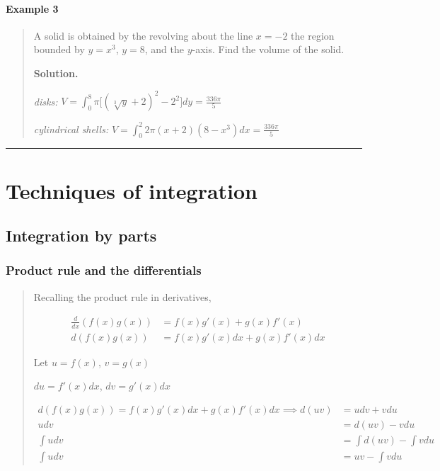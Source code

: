 \documentclass[
]{article}
\begin{document}
\hypertarget{example-3-3}{%
\paragraph*{Example 3}\label{example-3-3}}

\begin{quote}
A solid is obtained by the revolving about the line \(x=-2\) the region
bounded by \(y=x^3\), \(y=8\), and the \(y\)-axis. Find the volume of
the solid.

\textbf{Solution.}

\emph{disks:}
\(\displaystyle V = \int_0^8 \pi \big[ (\sqrt[3]{y} +2)^2 -2^2 \big] dy = \frac{336\pi}{5}\)

\emph{cylindrical shells:}
\(\displaystyle V = \int_0^2 2\pi (x+2)(8-x^3) dx = \frac{336\pi}{5}\)
\end{quote}

\begin{center}\rule{0.5\linewidth}{0.5pt}\end{center}

\hypertarget{techniques-of-integration}{%
\section{Techniques of integration}\label{techniques-of-integration}}

\hypertarget{integration-by-parts}{%
\subsection{Integration by parts}\label{integration-by-parts}}

\hypertarget{product-rule-and-the-differentials}{%
\subsubsection{Product rule and the
differentials}\label{product-rule-and-the-differentials}}

\begin{quote}
Recalling the product rule in derivatives,

\begin{align*}
\frac{d}{dx} (f(x)g(x)) &= f(x)g'(x) + g(x)f'(x)\\
d(f(x)g(x)) &= f(x)g'(x)dx + g(x)f'(x)dx
\end{align*}

Let \(u = f(x)\), \(v=g(x)\)

\(du = f'(x)dx\), \(dv = g'(x)dx\)

\begin{align*}
d(f(x)g(x)) = f(x)g'(x)dx +g(x)f'(x)dx \implies d(uv) &= udv + vdu\\
udv &= d(uv) - vdu\\
\int udv &= \int d(uv)- \int vdu\\
\int udv &= uv - \int vdu
\end{align*}
\end{quote}
\end{document}
